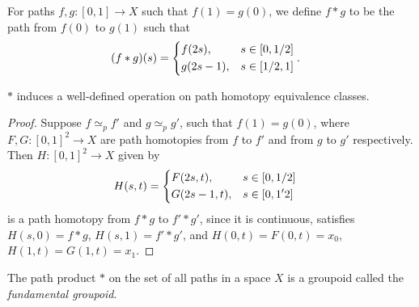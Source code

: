 \begin{defn}
    For paths $f, g: [0, 1] \to X$ such that $f(1) = g(0)$, we define $f * g$ to be the path from $f(0)$ to $g(1)$ such that
    \begin{align*}
        (f * g)(s) &= \begin{dcases}
            f(2s), &s \in [0, 1/2] \\
            g(2s-1), &s \in [1/2, 1]
        \end{dcases}.
    \end{align*}
\end{defn}

\begin{prop}
    $*$ induces a well-defined operation on path homotopy equivalence classes.
\end{prop}

\begin{proof}
    Suppose $f \simeq_p f'$ and $g \simeq_p g'$, such that $f(1) = g(0)$, where $F, G: [0, 1]^2 \to X$ are path homotopies from $f$ to $f'$ and from $g$ to $g'$ respectively. Then $H: [0, 1]^2 \to X$ given by
    \begin{align*}
        H(s, t) &= \begin{dcases}
            F(2s, t), &s \in [0, 1/2] \\
            G(2s-1, t), &s \in [0, 1'2]
        \end{dcases}
    \end{align*}
    is a path homotopy from $f * g$ to $f' * g'$, since it is continuous, satisfies $H(s, 0) = f * g$, $H(s, 1) = f' * g'$, and $H(0, t) = F(0, t) = x_0$, $H(1, t) = G(1, t) = x_1$.
\end{proof}

\begin{prop}
    The path product $*$ on the set of all paths in a space $X$ is a groupoid called the \emph{fundamental groupoid}.
\end{prop}

